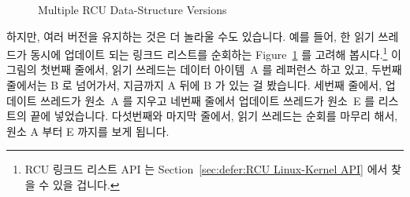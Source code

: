 \begin{figure}[tb]
\centering
{}
\caption{Multiple RCU Data-Structure Versions}
\label{fig:defer:Multiple RCU Data-Structure Versions}
\end{figure}

하지만, 여러 버전을 유지하는 것은 더 놀라울 수도 있습니다.
예를 들어, 한 읽기 쓰레드가 동시에 업데이트 되는 링크드 리스트를 순회하는
Figure~\ref{fig:defer:Multiple RCU Data-Structure Versions} 를 고려해
봅시다.\footnote{
	RCU 링크드 리스트 API 는
	Section~\ref{sec:defer:RCU Linux-Kernel API} 에서 찾을 수 있을 겁니다.}
이 그림의 첫번째 줄에서, 읽기 쓰레드는 데이터 아이템~A 를 레퍼런스 하고 있고,
두번째 줄에서는 B 로 넘어가서, 지금까지 A 뒤에 B 가 있는 걸 봤습니다.
세번째 줄에서, 업데이트 쓰레드가 원소~A 를 지우고 네번째 줄에서 업데이트
쓰레드가 원소~E 를 리스트의 끝에 넣었습니다.
다섯번째와 마지막 줄에서, 읽기 쓰레드는 순회를 마무리 해서, 원소 A 부터 E
까지를 보게 됩니다.
\iffalse

